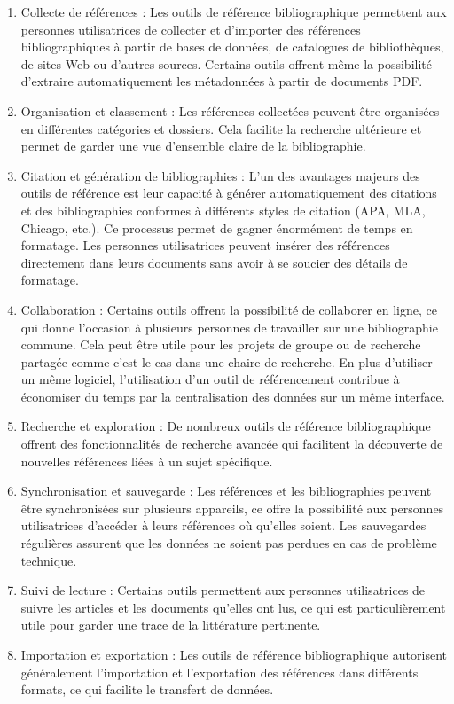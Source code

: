 \documentclass[
  letterpaper,
]{scrbook}
\begin{document}
\begin{enumerate}
\def\labelenumi{\arabic{enumi}.}
\item
  Collecte de références : Les outils de référence bibliographique
  permettent aux personnes utilisatrices de collecter et d'importer des
  références bibliographiques à partir de bases de données, de
  catalogues de bibliothèques, de sites Web ou d'autres sources.
  Certains outils offrent même la possibilité d'extraire automatiquement
  les métadonnées à partir de documents PDF.
\item
  Organisation et classement : Les références collectées peuvent être
  organisées en différentes catégories et dossiers. Cela facilite la
  recherche ultérieure et permet de garder une vue d'ensemble claire de
  la bibliographie.
\item
  Citation et génération de bibliographies : L'un des avantages majeurs
  des outils de référence est leur capacité à générer automatiquement
  des citations et des bibliographies conformes à différents styles de
  citation (APA, MLA, Chicago, etc.). Ce processus permet de gagner
  énormément de temps en formatage. Les personnes utilisatrices peuvent
  insérer des références directement dans leurs documents sans avoir à
  se soucier des détails de formatage.
\item
  Collaboration : Certains outils offrent la possibilité de collaborer
  en ligne, ce qui donne l'occasion à plusieurs personnes de travailler
  sur une bibliographie commune. Cela peut être utile pour les projets
  de groupe ou de recherche partagée comme c'est le cas dans une chaire
  de recherche. En plus d'utiliser un même logiciel, l'utilisation d'un
  outil de référencement contribue à économiser du temps par la
  centralisation des données sur un même interface.
\item
  Recherche et exploration : De nombreux outils de référence
  bibliographique offrent des fonctionnalités de recherche avancée qui
  facilitent la découverte de nouvelles références liées à un sujet
  spécifique.
\item
  Synchronisation et sauvegarde : Les références et les bibliographies
  peuvent être synchronisées sur plusieurs appareils, ce offre la
  possibilité aux personnes utilisatrices d'accéder à leurs références
  où qu'elles soient. Les sauvegardes régulières assurent que les
  données ne soient pas perdues en cas de problème technique.
\item
  Suivi de lecture : Certains outils permettent aux personnes
  utilisatrices de suivre les articles et les documents qu'elles ont
  lus, ce qui est particulièrement utile pour garder une trace de la
  littérature pertinente.
\item
  Importation et exportation : Les outils de référence bibliographique
  autorisent généralement l'importation et l'exportation des références
  dans différents formats, ce qui facilite le transfert de données.
\end{enumerate}
\end{document}
